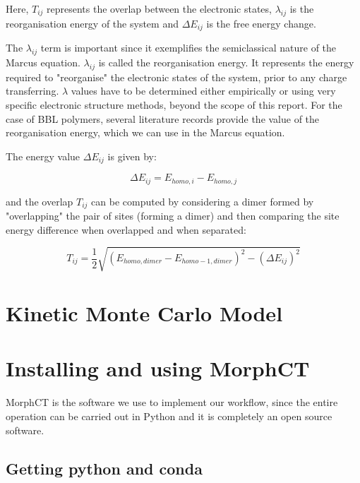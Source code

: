 \documentclass{article}
\begin{document}
Here, $T_{ij}$ represents the overlap between the electronic states, $\lambda_{ij}$ is the reorganisation energy of the system and $\Delta E_{ij}$ is the free energy change.


The $\lambda_{ij}$ term is important since it exemplifies the semiclassical nature of the Marcus equation. $\lambda_{ij}$ is called the reorganisation energy. It represents the energy required to "reorganise" the electronic states of the system, prior to any charge transferring. $\lambda$ values have to be determined either empirically or using very specific electronic structure methods, beyond the scope of this report. %
For the case of BBL polymers, several literature records provide the value of the reorganisation energy, which we can use in the Marcus equation.

The energy value $\Delta E_{ij}$ is given by:

$$\Delta E_{ij} = E_{homo, i} - E_{homo, j}$$

and the overlap $T_{ij}$ can be computed by considering a dimer formed by "overlapping" the pair of sites (forming a dimer) and then comparing the site energy difference when overlapped and when separated:

$$T_{ij} = \frac{1}{2} \sqrt{(E_{homo,dimer} - E_{homo-1,dimer})^2 - (\Delta E_{ij})^2}$$

\section{Kinetic Monte Carlo Model}



\section{Installing and using MorphCT}


MorphCT is the software we use to implement our workflow, since the entire operation can be carried out in Python and it is completely an open source software. 

\subsection{Getting python and conda}
\end{document}
